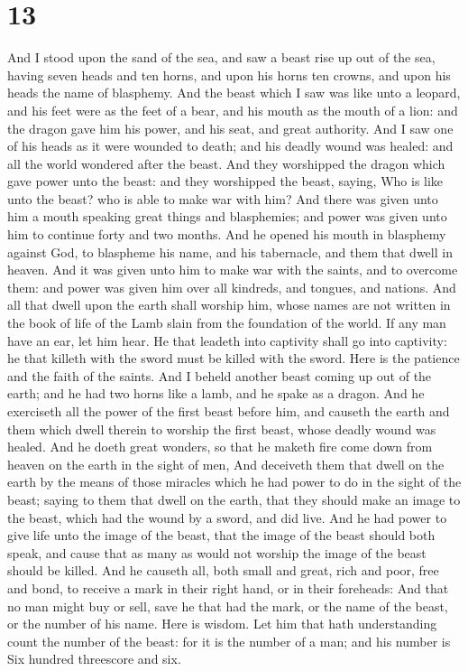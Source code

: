 \hypertarget{section-12}{%
\section{13}\label{section-12}}

 And I stood upon the sand of the sea, and saw a beast
rise up out of the sea, having seven heads and ten horns, and upon his
horns ten crowns, and upon his heads the name of blasphemy.
 And the beast which I saw was like unto a leopard, and
his feet were as the feet of a bear, and his mouth as the mouth of a
lion: and the dragon gave him his power, and his seat, and great
authority.  And I saw one of his heads as it were wounded
to death; and his deadly wound was healed: and all the world wondered
after the beast.  And they worshipped the dragon which
gave power unto the beast: and they worshipped the beast, saying, Who is
like unto the beast? who is able to make war with him? 
And there was given unto him a mouth speaking great things and
blasphemies; and power was given unto him to continue forty and two
months.  And he opened his mouth in blasphemy against God,
to blaspheme his name, and his tabernacle, and them that dwell in
heaven.  And it was given unto him to make war with the
saints, and to overcome them: and power was given him over all kindreds,
and tongues, and nations.  And all that dwell upon the
earth shall worship him, whose names are not written in the book of life
of the Lamb slain from the foundation of the world.  If
any man have an ear, let him hear.  He that leadeth into
captivity shall go into captivity: he that killeth with the sword must
be killed with the sword. Here is the patience and the faith of the
saints.  And I beheld another beast coming up out of the
earth; and he had two horns like a lamb, and he spake as a dragon.
 And he exerciseth all the power of the first beast
before him, and causeth the earth and them which dwell therein to
worship the first beast, whose deadly wound was healed. 
And he doeth great wonders, so that he maketh fire come down from heaven
on the earth in the sight of men,  And deceiveth them
that dwell on the earth by the means of those miracles which he had
power to do in the sight of the beast; saying to them that dwell on the
earth, that they should make an image to the beast, which had the wound
by a sword, and did live.  And he had power to give life
unto the image of the beast, that the image of the beast should both
speak, and cause that as many as would not worship the image of the
beast should be killed.  And he causeth all, both small
and great, rich and poor, free and bond, to receive a mark in their
right hand, or in their foreheads:  And that no man might
buy or sell, save he that had the mark, or the name of the beast, or the
number of his name.  Here is wisdom. Let him that hath
understanding count the number of the beast: for it is the number of a
man; and his number is Six hundred threescore and six.

